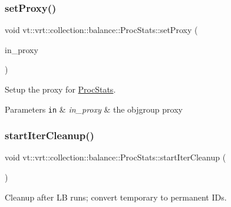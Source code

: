 \subsubsection{\texorpdfstring{set\+Proxy()}{setProxy()}}
{\footnotesize\ttfamily void vt\+::vrt\+::collection\+::balance\+::\+Proc\+Stats\+::set\+Proxy (\begin{DoxyParamCaption}\item[{\hyperlink{structvt_1_1objgroup_1_1proxy_1_1_proxy}{objgroup\+::proxy\+::\+Proxy}$<$ \hyperlink{structvt_1_1vrt_1_1collection_1_1balance_1_1_proc_stats}{Proc\+Stats} $>$}]{in\+\_\+proxy }\end{DoxyParamCaption})\hspace{0.3cm}{\ttfamily [private]}}



Setup the proxy for {\ttfamily \hyperlink{structvt_1_1vrt_1_1collection_1_1balance_1_1_proc_stats}{Proc\+Stats}}. 


\begin{DoxyParams}[1]{Parameters}
\mbox{\tt in}  & {\em in\+\_\+proxy} & the objgroup proxy \\
\hline
\end{DoxyParams}
\mbox{\label{structvt_1_1vrt_1_1collection_1_1balance_1_1_proc_stats_a6b8af21b777599060c4a532a5adb0100}} 
\subsubsection{\texorpdfstring{start\+Iter\+Cleanup()}{startIterCleanup()}}
{\footnotesize\ttfamily void vt\+::vrt\+::collection\+::balance\+::\+Proc\+Stats\+::start\+Iter\+Cleanup (\begin{DoxyParamCaption}{ }\end{DoxyParamCaption})}



Cleanup after LB runs; convert temporary to permanent I\+Ds. 

\mbox{\label{structvt_1_1vrt_1_1collection_1_1balance_1_1_proc_stats_afed5b2ba3c677167d38ae12c012ff993}} 
